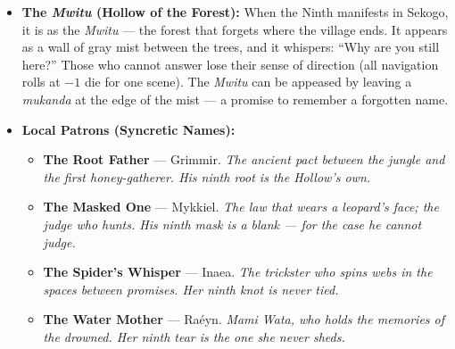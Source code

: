 \begin{itemize}
\item \textbf{The \textit{Mwitu} (Hollow of the Forest):} When the Ninth manifests in Sekogo, it is as the \textit{Mwitu} --- the forest that forgets where the village ends. It appears as a wall of gray mist between the trees, and it whispers: ``Why are you still here?'' Those who cannot answer lose their sense of direction (all navigation rolls at $-1$ die for one scene). The \textit{Mwitu} can be appeased by leaving a \textit{mukanda} at the edge of the mist --- a promise to remember a forgotten name.
\item \textbf{Local Patrons (Syncretic Names):}
  \begin{itemize}
    \item \textbf{The Root Father} --- Grimmir. \textit{The ancient pact between the jungle and the first honey-gatherer. His ninth root is the Hollow's own.}
    \item \textbf{The Masked One} --- Mykkiel. \textit{The law that wears a leopard's face; the judge who hunts. His ninth mask is a blank --- for the case he cannot judge.}
    \item \textbf{The Spider's Whisper} --- Inaea. \textit{The trickster who spins webs in the spaces between promises. Her ninth knot is never tied.}
    \item \textbf{The Water Mother} --- Ra\'{e}yn. \textit{Mami Wata, who holds the memories of the drowned. Her ninth tear is the one she never sheds.}
  \end{itemize}
\end{itemize}

